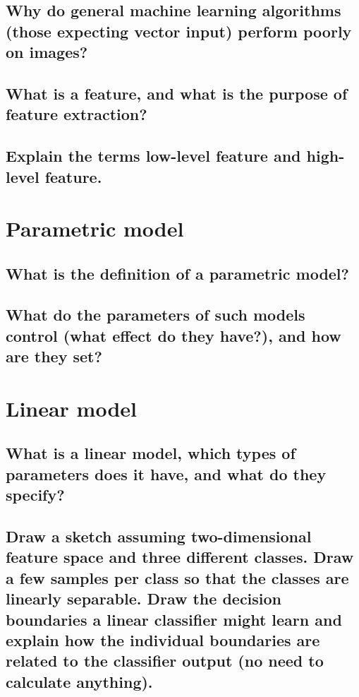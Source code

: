 \subsection{Why do general machine learning algorithms (those expecting vector input) perform poorly on images?}

\subsection{What is a feature, and what is the purpose of feature extraction?}

\subsection{Explain the terms low-level feature and high-level feature.}

\section{Parametric model}

\subsection{What is the definition of a parametric model?}

\subsection{What do the parameters of such models control (what effect do they have?), and how are they set?}

\section{Linear model}

\subsection{What is a linear model, which types of parameters does it have, and what do they specify?}

\subsection{Draw a sketch assuming two-dimensional feature space and three different classes. Draw a few samples per class so that the classes are linearly separable. Draw the decision boundaries a linear classifier might learn and explain how the individual boundaries are related to the classifier output (no need to calculate anything).}

